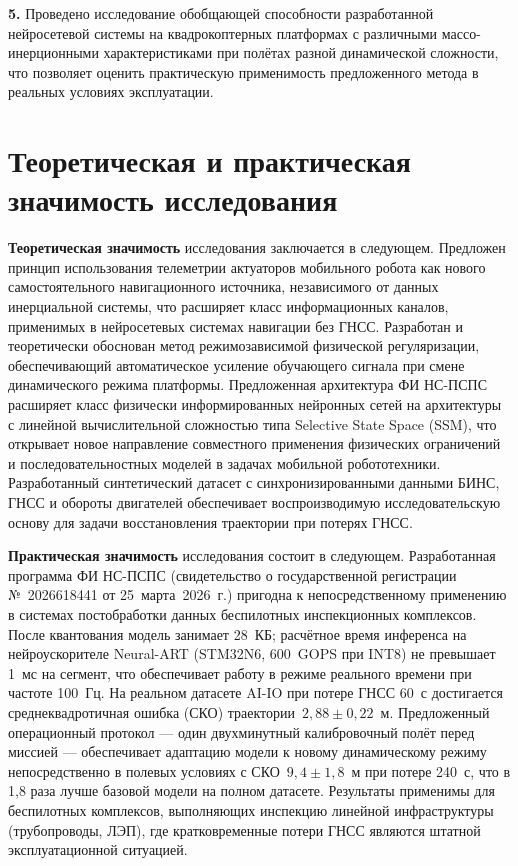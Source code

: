 \textbf{5.} Проведено исследование обобщающей способности разработанной нейросетевой системы на квадрокоптерных платформах с различными массо-инерционными характеристиками при полётах разной динамической сложности, что позволяет оценить практическую применимость предложенного метода в реальных условиях эксплуатации.

\section{Теоретическая и практическая значимость исследования}

\textbf{Теоретическая значимость} исследования заключается в следующем. Предложен
принцип использования телеметрии актуаторов мобильного робота как нового самостоятельного
навигационного источника, независимого от данных инерциальной системы, что расширяет класс
информационных каналов, применимых в нейросетевых системах навигации без ГНСС. Разработан
и теоретически обоснован метод режимозависимой физической регуляризации, обеспечивающий
автоматическое усиление обучающего сигнала при смене динамического режима платформы.
Предложенная архитектура ФИ НС-ПСПС расширяет класс физически информированных нейронных
сетей на архитектуры с линейной вычислительной сложностью типа Selective State Space (SSM), что открывает новое
направление совместного применения физических ограничений и последовательностных моделей
в задачах мобильной робототехники. Разработанный синтетический датасет с синхронизированными
данными БИНС, ГНСС и обороты двигателей обеспечивает воспроизводимую исследовательскую основу для
задачи восстановления траектории при потерях ГНСС.

\textbf{Практическая значимость} исследования состоит в следующем. Разработанная
программа ФИ НС-ПСПС (свидетельство о государственной регистрации №~2026618441 от
25~марта~2026~г.) пригодна к непосредственному применению в системах постобработки данных
беспилотных инспекционных комплексов. После квантования модель занимает 28~КБ; расчётное
время инференса на нейроускорителе Neural-ART (STM32N6, 600~GOPS при INT8) не превышает
1~мс на сегмент, что обеспечивает работу в режиме реального времени при частоте 100~Гц.
На реальном датасете AI-IO при потере ГНСС 60~с достигается среднеквадротичная ошибка (СКО) траектории~$2{,}88{\pm}0{,}22$~м.
Предложенный операционный протокол --- один двухминутный калибровочный полёт перед
миссией --- обеспечивает адаптацию модели к новому динамическому режиму непосредственно
в полевых условиях с СКО~$9{,}4{\pm}1{,}8$~м при потере 240~с, что в 1,8 раза лучше
базовой модели на полном датасете. Результаты применимы для беспилотных комплексов,
выполняющих инспекцию линейной инфраструктуры (трубопроводы, ЛЭП), где кратковременные
потери ГНСС являются штатной эксплуатационной ситуацией.

